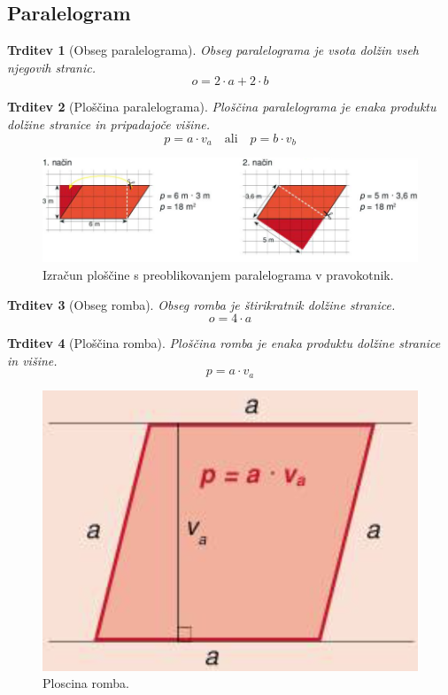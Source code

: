 \documentclass{article}
\newtheorem{trditev}{Trditev}[subsection]
\begin{document}
\pagebreak
\subsection{ Paralelogram }

\begin{trditev}[Obseg paralelograma]
    Obseg paralelograma je vsota dolžin vseh njegovih stranic.
    \[ o = 2 \cdot a + 2 \cdot b \]
\end{trditev}

\begin{trditev}[Ploščina paralelograma]
    Ploščina paralelograma je enaka produktu dolžine stranice in pripadajoče višine.
    \[ p = a \cdot v_a \quad \text{ali} \quad p = b \cdot v_b \]
\end{trditev}

\begin{figure}[h]
    \includegraphics[width=\linewidth]{ploscinaPralelograma.png}
    \centering
    \caption{Izračun ploščine s preoblikovanjem paralelograma v pravokotnik.}
\end{figure}


\begin{trditev}[Obseg romba]
    Obseg romba je štirikratnik dolžine stranice.
    \[ o = 4 \cdot a \]
\end{trditev}

\begin{trditev}[Ploščina romba]
    Ploščina romba je enaka produktu dolžine stranice in višine.
    \[ p = a \cdot v_a \]
\end{trditev}

\begin{figure}[h]
    \includegraphics[width=0.3\linewidth]{ploscinaRomba.png}
    \centering
    \caption{Ploscina romba.}
\end{figure}
\end{document}

